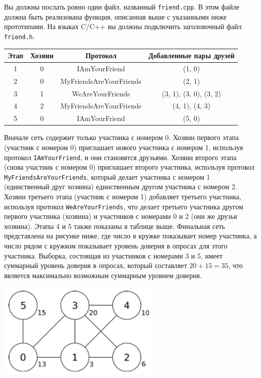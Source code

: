 Вы должны послать ровно один файл, названный \texttt{friend.cpp}. В этом файле должна быть реализована функция, описанная выше с указанными ниже прототипами. На языках C/C++ вы должны подключить заголовочный файл \texttt{friend.h}.

\begin{center}
\renewcommand{\arraystretch}{1.5}
\begin{tabular}{|c|c|c|c|}
\hline
Этап & Хозяин & Протокол & Добавленные пары друзей \\
\hline
1 &  0 & IAmYourFriend &  (1, 0) \\
\hline
2 & 0 & MyFriendsAreYourFriends & (2, 1) \\
\hline
3 & 1 & WeAreYourFriends & (3, 1), (3, 0), (3, 2)  \\
\hline
4 & 2 & MyFriendsAreYourFriends & (4, 1), (4, 3) \\
\hline
5 & 0 & IAmYourFriend & (5, 0) \\
\hline
\end{tabular}
\end{center}

Вначале сеть содержит только участника с номером 0. Хозяин первого этапа (участник с
номером 0) приглашает нового участника с номером 1, используя протокол \texttt{IAmYourFriend}, и они становятся друзьями. Хозяин второго этапа (снова участник с номером 0) приглашает второго участника, используя протокол \texttt{MyFriendsAreYourFriends}, который делает участника с номером 1 (единственный друг хозяина) единственным другом участника с номером 2. Хозяин третьего этапа (участник с номером 1) добавляет третьего участника, используя протокол \texttt{WeAreYourFriends}, что делает третьего участника другом первого участника (хозяина) и участников с номерами 0 и 2 (они же друзья хозяина). Этапы 4 и 5 также показаны в таблице выше. Финальная сеть представлена на рисунке ниже, где число в кружке показывает номер участника, а число рядом с кружком показывает уровень доверия в опросах для этого участника. Выборка, состоящая из участников с номерами 3 и 5, имеет суммарный уровень доверия в опросах, который составляет $20 + 15 = 35$, что является максимально возможным
суммарным уровнем доверия.

\includegraphics{1.png}